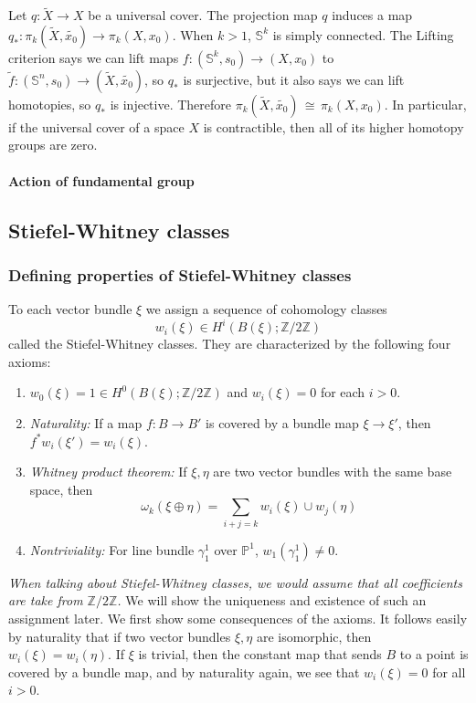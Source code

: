\documentclass[12pt]{article}
\theoremstyle{plain}
\theoremstyle{definition}
\newcommand{\IP}{\mathbb{P}}
\newcommand{\IS}{\mathbb{S}}
\newcommand{\IZ}{\mathbb{Z}}
\newcommand\iso{\,{\cong}\,}
\newcommand{\<}{\langle}
\renewcommand{\>}{\rangle}
\def\wt{\widetilde}
\newcommand{\w}{\omega}
\begin{document}
Let $q : \wt{X} \to X$ be a universal cover. The projection map $q$ induces a map $q_* : \pi_k(\wt{X}, \wt{x_0}) \to \pi_k(X, x_0)$. When $k > 1$, $\IS^k$ is simply connected. The Lifting criterion says we can lift maps $f : (\IS^k, s_0) \to (X, x_0)$ to $\wt{f} : (\IS^n, s_0) \to (\wt{X}, \wt{x_0})$, so $q_*$ is surjective, but it also says we can lift homotopies, so $q_*$ is injective. Therefore $\pi_k(\wt{X}, \wt{x_0}) \iso \pi_k(X, x_0)$. In particular, if the universal cover of a space $X$ is contractible, then all of its higher homotopy groups are zero. 

\paragraph{Action of fundamental group} 

\subsection{Stiefel-Whitney classes}
\subsubsection{Defining properties of Stiefel-Whitney classes}
To each vector bundle $\xi$ we assign a sequence of cohomology classes 
$$ w_i(\xi) \in H^i(B(\xi); \IZ/2\IZ)$$
called the Stiefel-Whitney classes. They are characterized by the following four axioms:
\begin{enumerate}
\item $w_0(\xi) = 1 \in H^0(B(\xi); \IZ/2\IZ)$ and $w_i(\xi) = 0$ for each $i > 0$.
\item \textit{Naturality: }If a map $f : B \to B'$ is covered by a bundle map $\xi \to \xi'$, then $f^* w_i(\xi') = w_i(\xi)$. 
\item \textit{Whitney product theorem: } If $\xi, \eta$ are two vector bundles with the same base space, then 
$$ \w_k(\xi \oplus \eta) = \sum_{i + j = k} w_i(\xi) \cup w_j(\eta) $$
\item \textit{Nontriviality: } For line bundle $\gamma^1_1$ over $\IP^1$, $w_1(\gamma^1_1) \neq 0$. 
\end{enumerate}
\textit{When talking about Stiefel-Whitney classes, we would assume that all coefficients are take from $\IZ/2\IZ$. }
We will show the uniqueness and existence of such an assignment later. We first show some consequences of the axioms. It follows easily by naturality that if two vector bundles $\xi, \eta$ are isomorphic, then $w_i(\xi) = w_i(\eta)$. If $\xi$ is trivial, then the constant map that sends $B$ to a point is covered by a bundle map, and by naturality again, we see that 
$w_i (\xi) = 0$ for all $i > 0$. 
\end{document}
